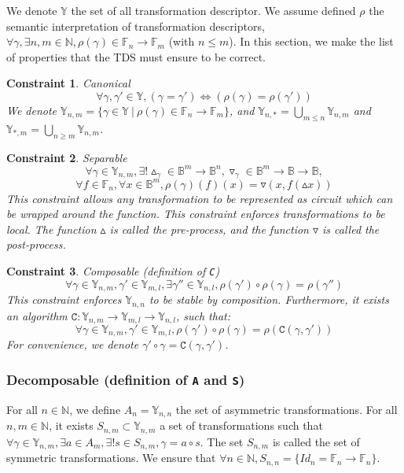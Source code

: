 \documentclass[a4paper,10pt]{article}
\newcommand{\N}{\mathbb{N}}%
\newcommand{\B}{\mathbb{B}}
\newcommand{\F}{\mathbb{F}}
\newcommand{\Y}{\mathbb{Y}}
\newtheorem{newcons}{Constraint}
\newcommand{\constraint}[2]{\begin{newcons}{#1\\}#2\end{newcons}}
\begin{document}
We denote $\Y$ the set of all transformation descriptor.
We assume defined $\rho$ the semantic interpretation of transformation descriptors, $\forall \gamma, \exists n, m \in\N, \rho(\gamma) \in \F_n \rightarrow \F_m$ (with $n\leq m$).
In this section, we make the list of properties that the TDS must ensure to be correct.

\constraint{Canonical}
{
\[\forall \gamma, \gamma' \in \Y, \left( \gamma = \gamma' \right) \Leftrightarrow \left( \rho(\gamma) = \rho(\gamma') \right) \]
We denote $\Y_{n, m} = \{ \gamma \in \Y ~|~ \rho(\gamma) \in \F_n \longrightarrow \F_m \}$, and $\Y_{n,*} = \bigcup_{m\leq n} \Y_{n, m}$ and $\Y_{*, m} = \bigcup_{n \geq m} \Y_{n, m}$.
}

\constraint{Separable}
{\[\forall \gamma \in \Y_{n, m}, \exists! \vartriangle_\gamma \in \B^m \rightarrow \B^n, \triangledown_\gamma \in \B^m \rightarrow \B \rightarrow \B,\]
\[\forall f\in \F_n, \forall x \in \B^m, \rho(\gamma)(f)(x) = \triangledown(x, f(\vartriangle x))\]
This constraint allows any transformation to be represented as circuit which can be wrapped around the function.
This constraint enforces transformations to be local.
The function $\vartriangle$ is called the pre-process, and the function $\triangledown$ is called the post-process.
}

\constraint{Composable (definition of \texttt{C})}
{\[\forall \gamma \in \Y_{n, m}, \gamma' \in \Y_{m, l}, \exists \gamma'' \in \Y_{n, l}, \rho(\gamma') \circ \rho(\gamma) = \rho(\gamma'')\]
This constraint enforces $\Y_{n, n}$ to be stable by composition.
Furthermore, it exists an algorithm $\mathtt{C} : \Y_{n, m} \rightarrow \Y_{m, l} \rightarrow \Y_{n, l}$, such that:
\[\forall \gamma \in \Y_{n, m}, \gamma' \in \Y_{m, l}, \rho(\gamma') \circ \rho(\gamma) = \rho(\mathtt{C}(\gamma, \gamma'))\]
For convenience, we denote $\gamma' \circ \gamma = \mathtt{C}(\gamma, \gamma')$.
}
\subsubsection{Decomposable (definition of \texttt{A} and \texttt{S})}

For all $n\in\N$, we define $A_n = \Y_{n, n}$ the set of asymmetric transformations.
For all $n, m\in\N$, it exists $S_{n, m} \subset \Y_{n, m}$ a set of transformations such that $\forall \gamma \in \Y_{n, m}, \exists a \in A_m, \exists! s \in S_{n, m},  \gamma = a \circ s$.
The set $S_{n, m}$ is called the set of symmetric transformations.
We ensure that $\forall n\in\N, S_{n, n} = \{ Id_n = \F_n \rightarrow \F_n \}$.
\end{document}

